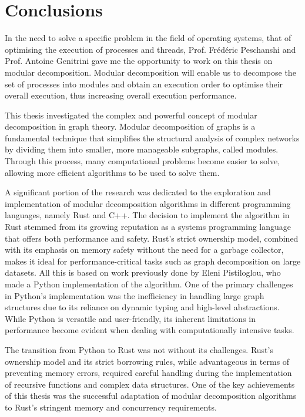 

\chapter{Conclusions}\label{ch:conclusions}


In the need to solve a specific problem in the field of operating systems, that of optimising the execution of processes and threads,
Prof. Frédéric Peschanshi and Prof. Antoine Genitrini gave me the opportunity to work on this thesis on modular decomposition.
Modular decomposition will enable us to decompose the set of processes into modules and obtain an execution order to optimise their overall execution, thus increasing overall execution performance.

This thesis investigated the complex and powerful concept of modular decomposition in graph theory.
Modular decomposition of graphs is a fundamental technique that simplifies the structural analysis of complex networks by dividing them into smaller, more manageable subgraphs, called modules.
Through this process, many computational problems become easier to solve, allowing more efficient algorithms to be used to solve them.

A significant portion of the research was dedicated to the exploration and implementation of modular decomposition algorithms in different programming languages, namely Rust and C++.
The decision to implement the algorithm in Rust stemmed from its growing reputation as a systems programming language that offers both performance and safety.
Rust’s strict ownership model, combined with its emphasis on memory safety without the need for a garbage collector, makes it ideal for performance-critical tasks such as graph decomposition on large datasets.
All this is based on work previously done by Eleni Pistiloglou, who made a Python implementation of the algorithm.
One of the primary challenges in Python's implementation was the inefficiency in handling large graph structures due to its reliance on dynamic typing and high-level abstractions.
While Python is versatile and user-friendly, its inherent limitations in performance become evident when dealing with computationally intensive tasks.

The transition from Python to Rust was not without its challenges.
Rust’s ownership model and its strict borrowing rules, while advantageous in terms of preventing memory errors, required careful handling during the implementation of recursive functions and complex data structures.
One of the key achievements of this thesis was the successful adaptation of modular decomposition algorithms to Rust’s stringent memory and concurrency requirements.

